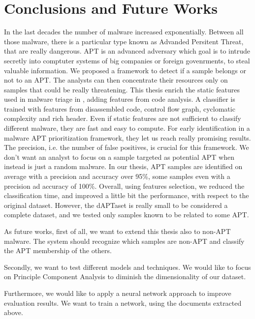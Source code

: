 \chapter{Conclusions and Future Works}
\label{ch:future}

In the last decades the number of malware increased exponentially. Between all those malware, there is a particular type known as Advanded Persitent Threat, that are really dangerous. APT is an advanced adversary which goal is to intrude secretly into comptuter systems of big companies or foreign govenrments, to steal valuable information. We proposed a framework to detect if a sample belongs or not to an APT. The analysts can then concentrate their resources only on samples that could be really threatening. This thesis enrich the static features used in malware triage in \cite{laurenza2017malware}, adding features from code analysis. A classifier is trained with features from disassembled code, control flow graph, cyclomatic complexity and rich header. Even if static features are not sufficient to classify different malware, they are fast and easy to compute. For early identification in a malware APT prioritization framework, they let us reach really promising results. The precision, i.e. the number of false positives, is crucial for this framework. We don't want an analyst to focus on a sample targeted as potential APT when instead is just a random malware. In our thesis, APT samples are identified on average with a precision and accuracy over 95\%, some samples even with a precision ad accuracy of 100\%. Overall, using features selection, we reduced the classification time, and improved a little bit the performance, with respect to the original dataset.  However, the dAPTaset is really small to be considered a complete dataset, and we tested only samples known to be related to some APT.

As future works, first of all, we want to extend this thesis also to non-APT malware. The system should recognize which samples are non-APT and classify the APT membership of the others. 

Secondly, we want to test different models and techniques. We would like to focus on Principle Component Analysis to diminish the dimensionality of our dataset. 

Furthermore, we would like to apply a neural network approach to improve evaluation results. We want to train a network, using the documents extracted above. 